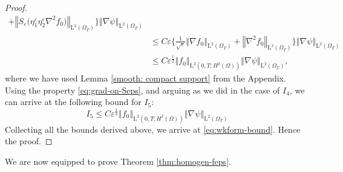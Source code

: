 \documentclass[preprint, 12pt]{amsart}
\numberwithin{equation}{section}
\numberwithin{equation}{section}
\newcommand{\eps}{\varepsilon}
\begin{document}
\begin{proof}
\begin{equation*}
\begin{aligned}
+ \left\Vert S_{\varepsilon}\Big(\eta_1^\eps \eta_2^\eps \nabla^2 f_0\Big) \right\Vert_{\mathrm L^2(\Omega_T)}
\Bigg\} \left\Vert \nabla \psi \right\Vert_{\mathrm L^2(\Omega_T)}
\\
& \le C \eps \Bigg\{
\frac{1}{\sqrt{\eps}} \left\Vert \nabla f_0 \right\Vert_{\mathrm L^2(\Omega_T)}
+ \left\Vert \nabla^2 f_0 \right\Vert_{\mathrm L^2(\Omega_T)}
\Bigg\} \left\Vert \nabla \psi \right\Vert_{\mathrm L^2(\Omega_T)}
\\
& \le C \eps^{\frac12}
\left\Vert f_0 \right\Vert_{\mathrm L^2(0,T; H^2(\Omega))}
\left\Vert \nabla \psi \right\Vert_{\mathrm L^2(\Omega_T)},
\end{aligned}
\end{equation*}
where we have used Lemma \ref{smooth: compact support} from the Appendix. Using the property \eqref{eq:grad-on-Seps}, and arguing as we did in the case of $I_4$, we can arrive at the following bound for $I_5$:
\begin{equation*}
I_5 \le C \eps^{\frac12}
\left\Vert f_0 \right\Vert_{\mathrm L^2(0,T; H^2(\Omega))}
\left\Vert \nabla \psi \right\Vert_{\mathrm L^2(\Omega_T)}
\end{equation*}
Collecting all the bounds derived above, we arrive at \eqref{eq:wkform-bound}. Hence the proof.
\end{proof}
We are now equipped to prove Theorem \ref{thm:homogen-feps}.
\end{document}
